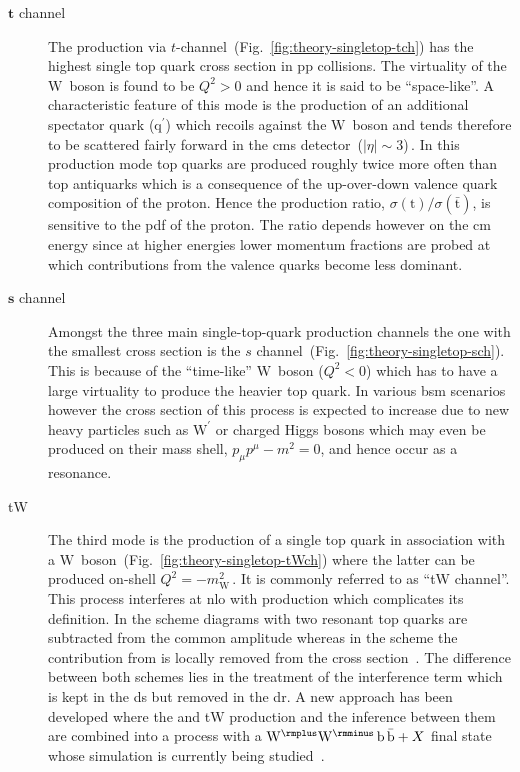 \begin{description}
\item[$\boldsymbol{t}$ channel] The production via $t$-channel~(Fig.~\ref{fig:theory-singletop-tch}) has the highest single top quark cross section in $\mathrm{pp}$ collisions. The virtuality of the $\mathrm{W}$~boson is found to be $Q^2>0$ and hence it is said to be ``space-like''. A characteristic feature of this mode is the production of an additional spectator quark ($\mathrm{q}^\prime$) which recoils against the $\mathrm{W}$~boson and tends therefore to be scattered fairly forward in the \gls{cms} detector~($|\eta|\sim 3$)\,. In this production mode top quarks are produced roughly twice more often than top antiquarks which is a consequence of the up-over-down valence quark composition of the proton. Hence the production ratio, $\sigma(\mathrm{t})/\sigma(\bar{\mathrm{t}})$, is sensitive to the \gls{pdf} of the proton. The ratio depends however on the \acrlong{cm} energy since at higher energies lower momentum fractions are probed at which contributions from the valence quarks become less dominant. 

\item[$\boldsymbol{s}$ channel] Amongst the three main single-top-quark production channels the one with the smallest cross section is the $s$ channel~(Fig.~\ref{fig:theory-singletop-sch}). This is because of the ``time-like'' $\mathrm{W}$~boson ($Q^2<0$) which has to have a large virtuality to produce the heavier top quark. In various \gls{bsm} scenarios however the cross section of this process is expected to increase due to new heavy particles such as $\mathrm{W}^\prime$ or charged Higgs bosons which may even be produced on their mass shell, $p_{\mu}p^{\mu}-m^{2}=0$, and hence occur as a resonance.

\item[tW] The third mode is the production of a single top quark in association with a $\mathrm{W}$~boson~(Fig.~\ref{fig:theory-singletop-tWch}) where the latter can be produced on-shell $Q^2=-m_\mathrm{W}^{2}$\,. It is commonly referred to as ``tW channel''. This process interferes at \gls{nlo} with \ttbar production which complicates its definition. In the  scheme diagrams with two resonant top quarks are subtracted from the common amplitude whereas in the  scheme the contribution from \ttbar is locally removed from the cross section~\cite{Tait:1999cf,1126-6708-2009-11-074}. The difference between both schemes lies in the treatment of the interference term which is kept in the \gls{ds} but removed in the \gls{dr}. A new approach has been developed where the \ttbar and tW production and the inference between them are combined into a process with a $\mathrm{W}^{\rmplus}\mathrm{W}^{\rmminus}\,\mathrm{b}\,\bar{\mathrm{b}}+X$ final state~\cite{Cascioli:2013wga} whose simulation is currently being studied~\cite{Jezo:2016ujg}.
\end{description}


